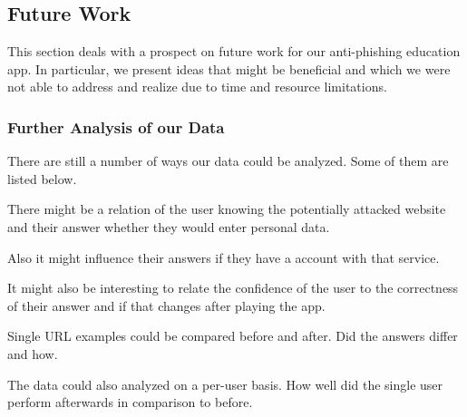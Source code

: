 \subsection{Future Work}
\label{s:future_work}
This section deals with a prospect on future work for our anti-phishing education app.
 In particular, we present ideas that might be beneficial and which we were not able to address and realize due to time and resource limitations.

\subsubsection{Further Analysis of our Data}
There are still a number of ways our data could be analyzed. Some of them are listed below.
\begin{description}[leftmargin=0cm]
	\item There might be a relation of the user knowing the potentially attacked website and their answer whether they would enter personal data.
	\item Also it might influence their answers if they have a account with that service.
	\item It might also be interesting to relate the confidence of the user to the correctness of their answer and if that changes after playing the app.
	\item Single URL examples could be compared before and after. Did the answers differ and how.
	\item The data could also analyzed on a per-user basis. How well did the single user perform afterwards in comparison to before.
\end{description}

